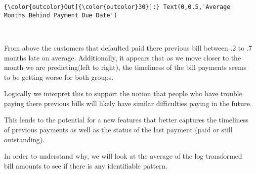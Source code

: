 \documentclass[11pt]{article}
\begin{document}
\begin{Verbatim}[commandchars=\\\{\}]
{\color{outcolor}Out[{\color{outcolor}30}]:} Text(0,0.5,'Average Months Behind Payment Due Date')
\end{Verbatim}
            
    \begin{center}
    \end{center}
    { \hspace*{\fill} \\}
    
    From above the customers that defaulted paid there previous bill between
.2 to .7 months late on average. Additionally, it appears that as we
move closer to the month we are predicting(left to right), the
timeliness of the bill payments seems to be getting worse for both
groups.

Logically we interpret this to support the notion that people who have
trouble paying there previous bills will likely have similar
difficulties paying in the future.

This lends to the potential for a new features that better captures the
timeliness of previous payments as well as the status of the last
payment (paid or still outstanding).

In order to understand why, we will look at the average of the log
transformed bill amounts to see if there is any identifiable pattern.
\end{document}
